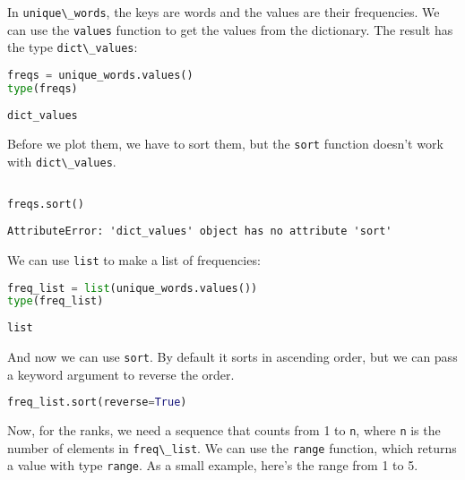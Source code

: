 In \passthrough{\lstinline!unique\_words!}, the keys are words and the
values are their frequencies. We can use the
\passthrough{\lstinline!values!} function to get the values from the
dictionary. The result has the type
\passthrough{\lstinline!dict\_values!}:

\begin{lstlisting}[language=Python,style=source]
freqs = unique_words.values()
type(freqs)
\end{lstlisting}

\begin{lstlisting}[style=output]
dict_values
\end{lstlisting}

Before we plot them, we have to sort them, but the
\passthrough{\lstinline!sort!} function doesn't work with
\passthrough{\lstinline!dict\_values!}.

\begin{lstlisting}[language=Python,style=source]
%%expect AttributeError

freqs.sort()
\end{lstlisting}

\begin{lstlisting}[style=output]
AttributeError: 'dict_values' object has no attribute 'sort'
\end{lstlisting}

We can use \passthrough{\lstinline!list!} to make a list of frequencies:

\begin{lstlisting}[language=Python,style=source]
freq_list = list(unique_words.values())
type(freq_list)
\end{lstlisting}

\begin{lstlisting}[style=output]
list
\end{lstlisting}

And now we can use \passthrough{\lstinline!sort!}. By default it sorts
in ascending order, but we can pass a keyword argument to reverse the
order.

\begin{lstlisting}[language=Python,style=source]
freq_list.sort(reverse=True)
\end{lstlisting}

Now, for the ranks, we need a sequence that counts from 1 to
\passthrough{\lstinline!n!}, where \passthrough{\lstinline!n!} is the
number of elements in \passthrough{\lstinline!freq\_list!}. We can use
the \passthrough{\lstinline!range!} function, which returns a value with
type \passthrough{\lstinline!range!}. As a small example, here's the
range from 1 to 5.

